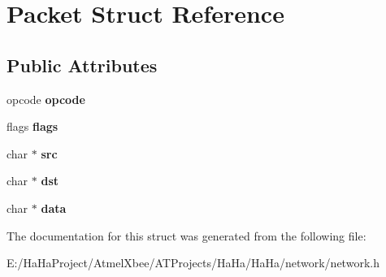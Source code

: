 \hypertarget{struct_packet}{}\section{Packet Struct Reference}
\label{struct_packet}
\subsection*{Public Attributes}
\begin{DoxyCompactItemize}
\item 
\mbox{\label{struct_packet_add7e8d0db5c932cdf6ff0252697b88b0}} 
opcode {\bfseries opcode}
\item 
\mbox{\label{struct_packet_a06b33fa705a08bf26d8f15f4e5a5eacc}} 
flags {\bfseries flags}
\item 
\mbox{\label{struct_packet_abd4ca96c59b8446f7fb688c489e8b53f}} 
char $\ast$ {\bfseries src}
\item 
\mbox{\label{struct_packet_ac190cf6efc3180c1167886410748f1b9}} 
char $\ast$ {\bfseries dst}
\item 
\mbox{\label{struct_packet_a6ce50b69127890b9012cb91f287f137f}} 
char $\ast$ {\bfseries data}
\end{DoxyCompactItemize}


The documentation for this struct was generated from the following file\+:\begin{DoxyCompactItemize}
\item 
E\+:/\+Ha\+Ha\+Project/\+Atmel\+Xbee/\+A\+T\+Projects/\+Ha\+Ha/\+Ha\+Ha/network/network.\+h\end{DoxyCompactItemize}
